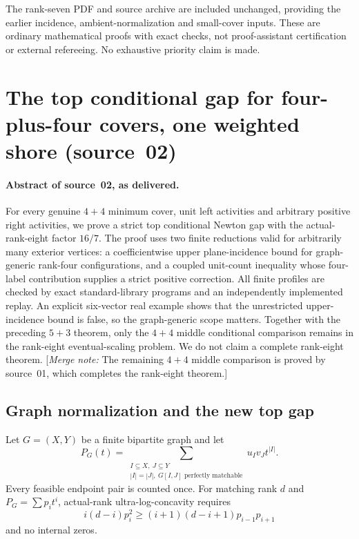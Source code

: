 \documentclass[11pt,a4paper]{article}
\theoremstyle{remark}\newtheorem{remark}[theorem]{Remark}
\newcommand{\mnote}[1]{[\textit{Merge note:} #1]}
\begin{document}
The rank-seven PDF and source archive are included unchanged, providing the earlier incidence, ambient-normalization and small-cover inputs. These are ordinary mathematical proofs with exact checks, not proof-assistant certification or external refereeing. No exhaustive priority claim is made.

\section{The top conditional gap for four-plus-four covers, one weighted shore (source~02)}\label{mrn:src:02}
\paragraph{Abstract of source~02, as delivered.} For every genuine $4+4$ minimum cover, unit left activities and arbitrary positive right activities, we prove a strict top conditional Newton gap with the actual-rank-eight factor $16/7$. The proof uses two finite reductions valid for arbitrarily many exterior vertices: a coefficientwise upper plane-incidence bound for graph-generic rank-four configurations, and a coupled unit-count inequality whose four-label contribution supplies a strict positive correction. All finite profiles are checked by exact standard-library programs and an independently implemented replay. An explicit six-vector real example shows that the unrestricted upper-incidence bound is false, so the graph-generic scope matters. Together with the preceding $5+3$ theorem, only the $4+4$ middle conditional comparison remains in the rank-eight eventual-scaling problem. We do not claim a complete rank-eight theorem.
\mnote{The remaining $4+4$ middle comparison is proved by source~01, which completes the rank-eight theorem.}

\subsection{Graph normalization and the new top gap}
Let $G=(X,Y)$ be a finite bipartite graph and let
\[
 P_G(t)=\sum_{\substack{I\subseteq X,\ J\subseteq Y\\|I|=|J|,\ G[I,J]\text{ perfectly matchable}}}u_Iv_Jt^{|I|}.
\]
Every feasible endpoint pair is counted once. For matching rank $d$ and $P_G=\sum p_it^i$, actual-rank ultra-log-concavity requires
\begin{equation}\label{mrn:e:ff:eq:gap}
 i(d-i)p_i^2\ge(i+1)(d-i+1)p_{i-1}p_{i+1}
\end{equation}
and no internal zeros.
\end{document}
